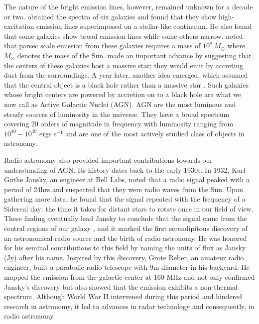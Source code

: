 The nature of the bright emission lines, however,  remained unknown for a decade or two.  \citet{seyfert1943nuclear} obtained the spectra of six galaxies and found that they show high-excitation emission lines superimposed on a stellar-like continuum. He also found that some galaxies show broad emission lines while some others narrow. \citet{woltjer1960magnetostatic} noted that parsec scale emission from these galaxies requires a mass of \siml$10^8~M_\odot$ where $M_\odot$ denotes the mass of the Sun. \citet{fowler1963star} made an important advance by suggesting that the centers of these galaxies host a massive star; they would emit by accreting dust from the surroundings. A year later, another idea emerged, which assumed that the central object is a black hole rather than a massive star \citep{salpeter1964accretion,zel1964estimating}. Such galaxies whose bright centers are powered by accretion on to a black hole are what we now call as Active Galactic Nuclei (AGN). 
AGN are the most luminous and steady sources of luminosity in the universe. They have a broad spectrum covering 20 orders of magnitude in frequency with luminosity ranging from $10^{40}-10^{49}$ ergs s$^{-1}$ and are one of the most actively studied class of objects in astronomy.

Radio astronomy also provided important contributions towards our understanding of AGN. Its history dates back to the early 1930s. In 1932, Karl Guthe Jansky, an engineer at Bell Labs, noted that a radio signal peaked with a period of 24hrs and suspected that they were radio waves from the Sun. Upon gathering more data, he found that the signal repeated with the frequency of a Sidereal day: the time it takes for distant stars to rotate once in our field of view. These finding eventually lead Jansky to conclude that the signal came from the central regions of our galaxy \citep{jansky1932directional}, and it marked the first serendipitous discovery of an astronomical radio source and the birth of radio astronomy. He was honored for his seminal contributions to this field by naming the units of flux as Jansky (Jy) after his name. Inspired by this discovery, Grote Reber, an amateur radio engineer, built a parabolic radio telescope with 9m diameter in his backyard. He mapped the emission from the galactic center at 160 MHz and not only confirmed Jansky's discovery \citep{reber1940cosmic} but also showed that the emission exhibits a non-thermal spectrum. Although World War II intervened during this period and hindered research in astronomy, it led to advances in radar technology and consequently, in radio astronomy. 


